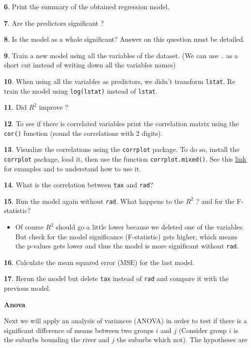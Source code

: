 \documentclass[]{book}
\newenvironment{rmdblock}[1]
  {\begin{shaded*}
  \begin{itemize}
  \renewcommand{\labelitemi}{
    \raisebox{-.7\height}[0pt][0pt]{
      {\setkeys{Gin}{width=2em,keepaspectratio}\texttt{[image: img/icons/\#1]}}
    }
  }
  \item
  }
  {
  \end{itemize}
  \end{shaded*}
  }
\newenvironment{rmdinsight}
  {\begin{rmdblock}{insight}}
  {\end{rmdblock}}
\theoremstyle{definition}
\theoremstyle{definition}
\theoremstyle{definition}
\theoremstyle{remark}
\begin{document}
\textbf{6}. Print the summary of the obtained regression model.

\textbf{7}. Are the predictors significant ?

\textbf{8}. Is the model as a whole significant? Answer on this question
must be detailed.

\textbf{9}. Train a new model using all the variables of the dataset.
(We can use \texttt{.} as a short cut instead of writing down all the
variables names)

\textbf{10}. When using all the variables as predictors, we didn't
transform \texttt{lstat}. Re train the model using \texttt{log(lstat)}
instead of \texttt{lstat}.

\textbf{11}. Did \(R^2\) improve ?

\textbf{12}. To see if there is correlated variables print the
correlation matrix using the \texttt{cor()} function (round the
correlations with 2 digits).

\textbf{13}. Visualize the correlations using the \texttt{corrplot}
package. To do so, install the \texttt{corrplot} package, load it, then
use the function \texttt{corrplot.mixed()}. See this
\href{https://cran.r-project.org/web/packages/corrplot/vignettes/corrplot-intro.html}{link}
for examples and to understand how to use it.

\textbf{14}. What is the correlation between \texttt{tax} and
\texttt{rad}?

\textbf{15}. Run the model again without \texttt{rad}. What happens to
the \(R^2\) ? and for the F-statistic?

\begin{rmdinsight}
Of course \(R^2\) should go a little lower because we deleted one of the
variables. But check for the model significance (F-statistic) gets
higher, which means the p-values gets lower and thus the model is more
significant without \texttt{rad}.
\end{rmdinsight}

\textbf{16}. Calculate the mean squared error (MSE) for the last model.

\textbf{17}. Rerun the model but delete \texttt{tax} instead of
\texttt{rad} and compare it with the previous model.

\textbf{Anova}

Next we will apply an analysis of variances (ANOVA) in order to test if
there is a significant difference of means between two groups \(i\) and
\(j\) (Consider group \(i\) is the suburbs bounding the river and \(j\)
the suburbs which not). The hypotheses are
\end{document}
